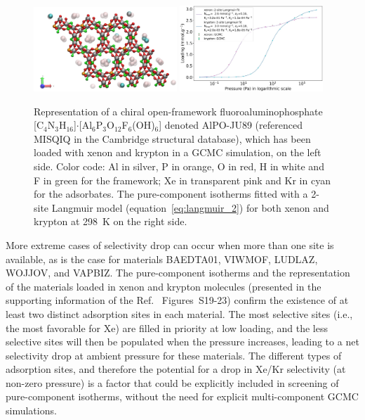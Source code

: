 \documentclass[main.tex]{subfiles}
\begin{document}
\begin{figure}[t]
  \centering
    \includegraphics[width=0.48\textwidth]{figures/2-thermo/MISQIQ_clean.jpg}\hfill
    \includegraphics[width=0.48\textwidth]{figures/2-thermo/MISQIQ_clean_isotherm_xenon_krypton_298K.jpg}
    \caption{Representation of a chiral open-framework fluoroaluminophosphate [C$_4$N$_3$H$_{16}$]$\cdot$[Al$_6$P$_3$O$_{12}$F$_6$(OH)$_6$] denoted AlPO-JU89 (referenced MISQIQ in the Cambridge structural database), which has been loaded with xenon and krypton in a GCMC simulation, on the left side.\autocite{MISQIQ} Color code: Al in silver, P in orange, O in red, H in white and F in green for the framework; Xe in transparent pink and Kr in cyan for the adsorbates. The pure-component isotherms fitted with a 2-site Langmuir model (equation~\ref{eq:langmuir_2}) for both xenon and krypton at \SI{298}{\kelvin} on the right side.}\label{fgr:MISQIQ}
  \end{figure}

More extreme cases of selectivity drop can occur when more than one site is available, as is the case for materials BAEDTA01, VIWMOF, LUDLAZ, WOJJOV, and VAPBIZ. The pure-component isotherms and the representation of the materials loaded in xenon and krypton molecules (presented in the supporting information of the Ref.~\cite{Ren_2021} Figures~S19-23) confirm the existence of at least two distinct adsorption sites in each material. The most selective sites (i.e., the most favorable for Xe) are filled in priority at low loading, and the less selective sites will then be populated when the pressure increases, leading to a net selectivity drop at ambient pressure for these materials. The different types of adsorption sites, and therefore the potential for a drop in Xe/Kr selectivity (at non-zero pressure) is a factor that could be explicitly included in screening of pure-component isotherms, without the need for explicit multi-component GCMC simulations.
\end{document}
